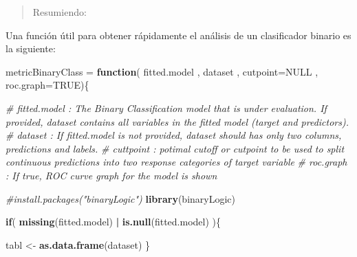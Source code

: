 \documentclass[]{book}
\newenvironment{Shaded}{\begin{snugshade}}{\end{snugshade}}
\newcommand{\CommentTok}[1]{\textcolor[rgb]{0.56,0.35,0.01}{\textit{#1}}}
\newcommand{\ControlFlowTok}[1]{\textcolor[rgb]{0.13,0.29,0.53}{\textbf{#1}}}
\newcommand{\DataTypeTok}[1]{\textcolor[rgb]{0.13,0.29,0.53}{#1}}
\newcommand{\KeywordTok}[1]{\textcolor[rgb]{0.13,0.29,0.53}{\textbf{#1}}}
\newcommand{\NormalTok}[1]{#1}
\newcommand{\OperatorTok}[1]{\textcolor[rgb]{0.81,0.36,0.00}{\textbf{#1}}}
\newcommand{\OtherTok}[1]{\textcolor[rgb]{0.56,0.35,0.01}{#1}}
\newcommand{\StringTok}[1]{\textcolor[rgb]{0.31,0.60,0.02}{#1}}
\begin{document}
\begin{quote}
Resumiendo:
\end{quote}

Una función útil para obtener rápidamente el análisis de un clasificador binario es la siguiente:

\begin{Shaded}
\begin{Highlighting}[]
\NormalTok{metricBinaryClass =}\StringTok{ }\ControlFlowTok{function}\NormalTok{( fitted.model , dataset , }\DataTypeTok{cutpoint=}\OtherTok{NULL}\NormalTok{ , }\DataTypeTok{roc.graph=}\OtherTok{TRUE}\NormalTok{)\{}
  
  \CommentTok{# fitted.model : The Binary Classification model that is under evaluation. If provided, dataset contains all variables in the fitted model (target and predictors).}
  \CommentTok{# dataset      : If fitted.model is not provided, dataset should has only two columns, predictions and labels.}
  \CommentTok{# cuttpoint    : potimal cutoff or cutpoint to be used to split continuous predictions into two response categories of target variable}
  \CommentTok{# roc.graph    : If true, ROC curve graph for the model is shown }
  
  \CommentTok{#install.packages("binaryLogic")}
  \KeywordTok{library}\NormalTok{(binaryLogic)}
  
  \ControlFlowTok{if}\NormalTok{( }\KeywordTok{missing}\NormalTok{(fitted.model) }\OperatorTok{|}\StringTok{ }\KeywordTok{is.null}\NormalTok{(fitted.model) )\{}
    
\NormalTok{    tabl  <-}\StringTok{ }\KeywordTok{as.data.frame}\NormalTok{(dataset)}
\NormalTok{  \} }
  

\end{Highlighting}
\end{Shaded}
\end{document}

